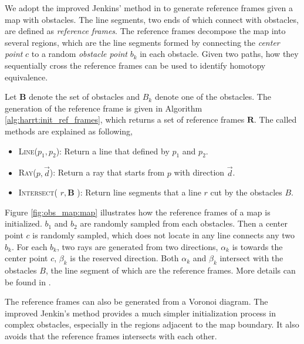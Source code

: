 \documentclass[letterpaper, 10 pt, conference]{ieeeconf}
\begin{document}
We adopt the improved Jenkins' method in \cite{Hernandez201544} to generate reference frames given a map with obstacles.
The line segments, two ends of which connect with obstacles, are defined as \emph{reference frames}.
The reference frames decompose the map into several regions, which are the line segments formed by connecting the \emph{center point} $ c $ to a random \emph{obstacle point} $ b_{k} $ in each obstacle.
Given two paths, how they sequentially cross the reference frames can be used to identify homotopy equivalence.


Let $ \bm{B} $ denote the set of obstacles and $ B_{k} $ denote one of the obstacles.  
The generation of the reference frame is given in Algorithm \ref{alg:harrt:init_ref_frames}, which returns a set of reference frames $ \bm{R} $.
The called methods are explained as following,
\begin{itemize}
	\item \textsc{Line}($ p_{1}, p_{2} $):
	Return a line that defined by $ p_{1} $ and $ p_{2} $.
	\item \textsc{Ray}($ p, \vec{d} $):
	Return a ray that starts from $ p $ with direction $ \vec{d}  $.
	\item \textsc{Intersect}( $ r , \bm{B} $ ):
	Return line segments that a line $ r $ cut by the obstacles $ B $.
\end{itemize}

Figure \ref{fig:obs_map:map} illustrates how the reference frames of a map is initialized.
$ b_{1} $ and $ b_{2} $ are randomly sampled from each obstacles.
Then a center point $ c $ is randomly sampled, which does not locate in any line connects any two $ b_{k} $.
For each $ b_{k} $, two rays are generated from two directions, $ \alpha_{k} $ is towards the center point $ c $, $ \beta_{k} $ is the reserved direction.
Both $ \alpha_{k} $ and $ \beta_{k} $ intersect with the obstacles $ B $, the line segment of which are the reference frames.
More details can be found in \cite{Hernandez201544}.

The reference frames can also be generated from a Voronoi diagram.
The improved Jenkin's method provides a much simpler initialization process in complex obstacles, especially in the regions adjacent to the map boundary.
It also avoids that the reference frames intersects with each other.
\end{document}
